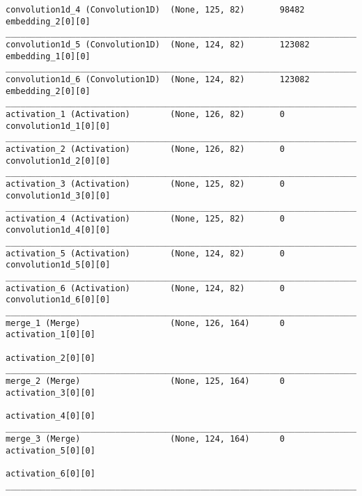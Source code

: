 \begin{lstlisting}[basicstyle=\tiny,frame=single]
convolution1d_4 (Convolution1D)  (None, 125, 82)       98482       embedding_2[0][0]                  
____________________________________________________________________________________________________  
convolution1d_5 (Convolution1D)  (None, 124, 82)       123082      embedding_1[0][0]                  
____________________________________________________________________________________________________  
convolution1d_6 (Convolution1D)  (None, 124, 82)       123082      embedding_2[0][0]                  
____________________________________________________________________________________________________  
activation_1 (Activation)        (None, 126, 82)       0           convolution1d_1[0][0]              
____________________________________________________________________________________________________  
activation_2 (Activation)        (None, 126, 82)       0           convolution1d_2[0][0]              
____________________________________________________________________________________________________  
activation_3 (Activation)        (None, 125, 82)       0           convolution1d_3[0][0]              
____________________________________________________________________________________________________  
activation_4 (Activation)        (None, 125, 82)       0           convolution1d_4[0][0]              
____________________________________________________________________________________________________  
activation_5 (Activation)        (None, 124, 82)       0           convolution1d_5[0][0]              
____________________________________________________________________________________________________  
activation_6 (Activation)        (None, 124, 82)       0           convolution1d_6[0][0]
____________________________________________________________________________________________________  
merge_1 (Merge)                  (None, 126, 164)      0           activation_1[0][0]
                                                                   activation_2[0][0]
____________________________________________________________________________________________________
merge_2 (Merge)                  (None, 125, 164)      0           activation_3[0][0]
                                                                   activation_4[0][0]
____________________________________________________________________________________________________
merge_3 (Merge)                  (None, 124, 164)      0           activation_5[0][0]
                                                                   activation_6[0][0]
____________________________________________________________________________________________________

\end{lstlisting}
